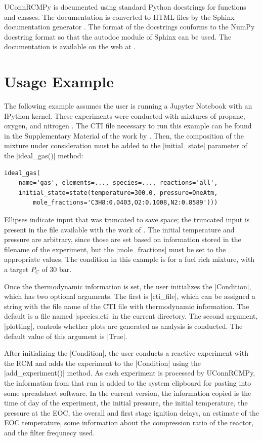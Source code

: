 \documentclass[12pt]{../ussci}
\begin{document}
UConnRCMPy is documented using standard Python docstrings for functions
and classes. The documentation is converted to HTML files by the Sphinx
documentation generator \autocite{Brandl2016}. The format of the
docstrings conforms to the NumPy docstring format so that the autodoc
module of Sphinx can be used. The documentation is available on the web
at \href{https://bryanwweber.github.io/UConnRCMPy/}.

\section{Usage Example}\label{usage-example}

The following example assumes the user is running a Jupyter Notebook with an
IPython kernel. These experiments were conducted with mixtures of propane,
oxygen, and nitrogen \autocite{Dames2016}. The CTI file necessary to run this
example can be found in the Supplementary Material of the work by
\textcite{Dames2016}. Then, the composition of the mixture under consideration
must be added to the \python|initial_state| parameter of the
\python|ideal_gas()| method:

\begin{verbatim}
ideal_gas(
    name='gas', elements=..., species=..., reactions='all',
    initial_state=state(temperature=300.0, pressure=OneAtm,
        mole_fractions='C3H8:0.0403,O2:0.1008,N2:0.8589')))
\end{verbatim}

Ellipses indicate input that was truncated to save space; the truncated
input is present in the file available with the work of \textcite{Dames2016}. The
initial temperature and pressure are arbitrary, since those are set
based on information stored in the filename of the experiment, but the
\python|mole_fractions| must be set to the appropriate values. The
condition in this example is for a fuel rich mixture, with a target
\(P_C\) of 30 bar.

Once the thermodynamic information is set, the user initializes the
\python|Condition|, which has two optional arguments. The first is
\python|cti_file|, which can be assigned a string with the file name
of the CTI file with thermodynamic information. The default is a file named
\python|species.cti| in the current directory. The second argument,
\python|plotting|, controls whether plots are generated as analysis
is conducted. The default value of this argument is \python|True|.

After initializing the \python|Condition|, the user conducts a
reactive experiment with the RCM and adds the experiment to the
\python|Condition| using the \python|add_experiment()|
method. As each experiment is processed by UConnRCMPy, the information from
that run is added to the system clipboard for pasting into some spreadsheet
software. In the current version, the information copied is the time of day of
the experiment, the initial pressure, the initial temperature, the pressure at
the EOC, the overall and first stage ignition delays, an estimate of the EOC
temperature, some information about the compression ratio of the reactor, and
the filter frequnecy used.
\end{document}
